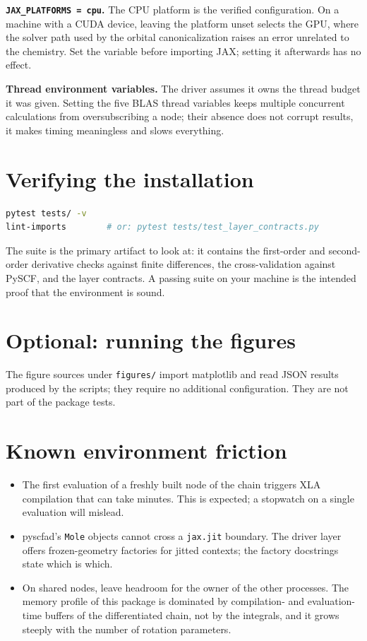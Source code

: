 \textbf{\texttt{JAX\_PLATFORMS = cpu}.} The CPU platform is the
verified configuration.  On a machine with a CUDA device, leaving the
platform unset selects the GPU, where the solver path used by the
orbital canonicalization raises an error unrelated to the chemistry.
Set the variable before importing JAX; setting it afterwards has no
effect.

\textbf{Thread environment variables.} The driver assumes it owns the
thread budget it was given.  Setting the five BLAS thread variables
keeps multiple concurrent calculations from oversubscribing a node;
their absence does not corrupt results, it makes timing meaningless and
slows everything.

\section{Verifying the installation}

\begin{lstlisting}[language=bash]
pytest tests/ -v
lint-imports        # or: pytest tests/test_layer_contracts.py
\end{lstlisting}

The suite is the primary artifact to look at: it contains the
first-order and second-order derivative checks against finite
differences, the cross-validation against PySCF, and the layer
contracts.  A passing suite on your machine is the intended proof that
the environment is sound.

\section{Optional: running the figures}

The figure sources under \texttt{figures/} import matplotlib and read
JSON results produced by the scripts; they require no additional
configuration.  They are not part of the package tests.

\section{Known environment friction}

\begin{itemize}
  \item The first evaluation of a freshly built node of the chain
    triggers XLA compilation that can take minutes.  This is expected;
    a stopwatch on a single evaluation will mislead.
  \item pyscfad's \texttt{Mole} objects cannot cross a
    \texttt{jax.jit} boundary.  The driver layer offers frozen-geometry
    factories for jitted contexts; the factory docstrings state which
    is which.
  \item On shared nodes, leave headroom for the owner of the other
    processes.  The memory profile of this package is dominated by
    compilation- and evaluation-time buffers of the differentiated
    chain, not by the integrals, and it grows steeply with the number
    of rotation parameters.
\end{itemize}
